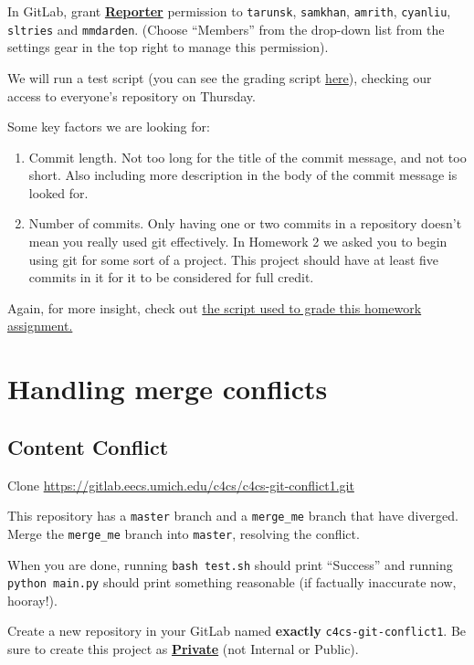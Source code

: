 \documentclass{article}
\begin{document}
In GitLab, grant \textbf{\ul{Reporter}} permission to \texttt{tarunsk}, \texttt{samkhan}, \texttt{amrith}, \texttt{cyanliu}, \texttt{sltries} and
\texttt{mmdarden}.
(Choose ``Members'' from the drop-down list from the settings gear in the top
right to manage this permission).

We will run a test script (you can see the grading script
\href{https://github.com/c4cs/autograders/tree/master/git-II}{here}), checking our access to everyone's repository on
Thursday.

Some key factors we are looking for:
\begin{enumerate}
    \item Commit length. Not too long for the title of the commit message, and
        not too short. Also including more description in the body of the commit
        message is looked for.

    \item Number of commits. Only having one or two commits in a repository
        doesn't mean you really used git effectively. In Homework 2 we asked you
        to begin using git for some sort of a project. This project should have
        at least five commits in it for it to be considered for full credit.
\end{enumerate}

Again, for more insight, check out
\href{https://github.com/c4cs/autograders/tree/master/git-II}{the
script used to grade this homework assignment.}

\newpage
\section{Handling merge conflicts}

\subsection{Content Conflict}

Clone \url{https://gitlab.eecs.umich.edu/c4cs/c4cs-git-conflict1.git}

This repository has a \texttt{master} branch and a \texttt{merge\_me} branch
that have diverged. Merge the \texttt{merge\_me} branch into \texttt{master},
resolving the conflict.

When you are done, running \texttt{bash test.sh} should print ``Success'' and
running \texttt{python main.py} should print something reasonable (if
factually inaccurate now, hooray!).

Create a new repository in your GitLab named \textbf{exactly}
\texttt{c4cs-git-conflict1}.
Be sure to create this project as
\textbf{\ul{Private}} (not Internal or Public).
\end{document}
